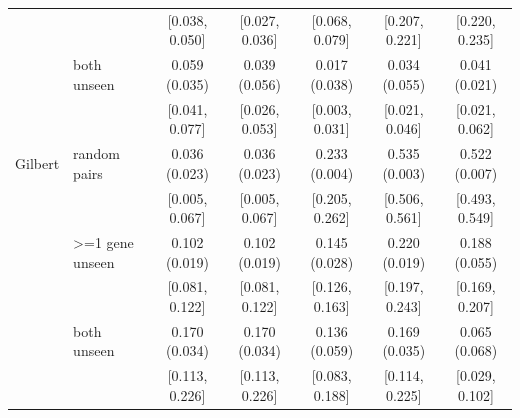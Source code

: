 \begin{tabular}{ll|ccccc}
 & & \scriptsize[0.038, 0.050] & \scriptsize[0.027, 0.036] & \scriptsize[0.068, 0.079] & \scriptsize[0.207, 0.221] & \scriptsize[0.220, 0.235] \\
 & both unseen & 0.059 (0.035) & 0.039 (0.056) & 0.017 (0.038) & 0.034 (0.055) & 0.041 (0.021) \\
 & & \scriptsize[0.041, 0.077] & \scriptsize[0.026, 0.053] & \scriptsize[0.003, 0.031] & \scriptsize[0.021, 0.046] & \scriptsize[0.021, 0.062] \\
\hline
Gilbert & random pairs & 0.036 (0.023) & 0.036 (0.023) & 0.233 (0.004) & 0.535 (0.003) & 0.522 (0.007) \\
 & & \scriptsize[0.005, 0.067] & \scriptsize[0.005, 0.067] & \scriptsize[0.205, 0.262] & \scriptsize[0.506, 0.561] & \scriptsize[0.493, 0.549] \\
 & >=1 gene unseen & 0.102 (0.019) & 0.102 (0.019) & 0.145 (0.028) & 0.220 (0.019) & 0.188 (0.055) \\
 & & \scriptsize[0.081, 0.122] & \scriptsize[0.081, 0.122] & \scriptsize[0.126, 0.163] & \scriptsize[0.197, 0.243] & \scriptsize[0.169, 0.207] \\
 & both unseen & 0.170 (0.034) & 0.170 (0.034) & 0.136 (0.059) & 0.169 (0.035) & 0.065 (0.068) \\
 & & \scriptsize[0.113, 0.226] & \scriptsize[0.113, 0.226] & \scriptsize[0.083, 0.188] & \scriptsize[0.114, 0.225] & \scriptsize[0.029, 0.102] \\
\hline
\end{tabular}